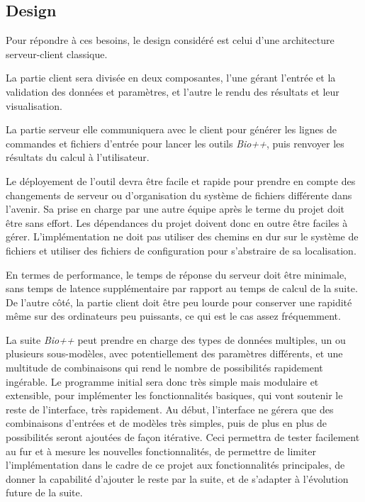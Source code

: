 \subsection{Design}

Pour répondre à ces besoins,
le design considéré est celui d'une architecture serveur-client classique.

La partie client sera divisée en deux composantes,
l'une gérant l'entrée et la validation des données et paramètres,
et l'autre le rendu des résultats et leur visualisation.

La partie serveur elle communiquera avec le client
pour générer les lignes de commandes et fichiers d'entrée
pour lancer les outils \textit{Bio++},
puis renvoyer les résultats du calcul à l'utilisateur.

Le déployement de l'outil devra être facile et rapide
pour prendre en compte des changements de serveur
ou d'organisation du système de fichiers différente dans l'avenir.
Sa prise en charge par une autre équipe après le terme du projet
doit être sans effort.
Les dépendances du projet doivent donc en outre
être faciles à gérer.
L'implémentation ne doit pas utiliser des chemins en dur sur le système de fichiers
et utiliser des fichiers de configuration
pour s'abstraire de sa localisation.

En termes de performance,
le temps de réponse du serveur doit être minimale,
sans temps de latence supplémentaire par rapport au temps de calcul de la suite.
De l'autre côté, la partie client doit être peu lourde
pour conserver une rapidité même sur des ordinateurs peu puissants,
ce qui est le cas assez fréquemment.

La suite \textit{Bio++} peut prendre en charge
des types de données multiples, un ou plusieurs sous-modèles,
avec potentiellement des paramètres différents,
et une multitude de combinaisons
qui rend le nombre de possibilités rapidement ingérable.
Le programme initial sera donc très simple mais modulaire et extensible,
pour implémenter les fonctionnalités basiques,
qui vont soutenir le reste de l'interface,
très rapidement.
Au début, l'interface ne gérera que
des combinaisons d'entrées et de modèles très simples,
puis de plus en plus de possibilités seront ajoutées de façon itérative.
Ceci permettra
de tester facilement au fur et à mesure les nouvelles fonctionnalités,
de permettre de limiter l'implémentation dans le cadre de ce projet
aux fonctionnalités principales,
de donner la capabilité d'ajouter le reste par la suite,
et de s'adapter à l'évolution future de la suite.


